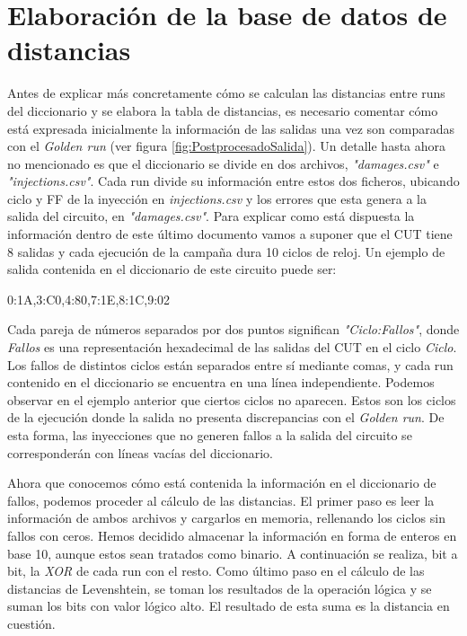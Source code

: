 \section{Elaboración de la base de datos de distancias}
\label{sec:LevenDist}
Antes de explicar más concretamente cómo se calculan las distancias entre runs del
diccionario y se elabora la tabla de distancias, es necesario comentar cómo está
expresada inicialmente la información de las salidas una vez son comparadas con el
\textit{Golden run} (ver figura \ref{fig:PostprocesadoSalida}). Un detalle hasta 
ahora no mencionado es que el diccionario se divide en dos archivos,
\textit{"damages.csv"} e \textit{"injections.csv"}. Cada run divide su información
entre estos dos ficheros, ubicando ciclo y \gls{FF} de la inyección en 
\textit{injections.csv} y los errores que esta genera a la salida del circuito, en
\textit{"damages.csv"}.
Para explicar como está dispuesta la información dentro de este último documento 
vamos a suponer que el \gls{CUT} tiene 8 salidas y cada ejecución de la campaña 
dura 10 ciclos de reloj. Un ejemplo de salida contenida en el diccionario de este
circuito puede ser:

\begin{center}
    0:1A,3:C0,4:80,7:1E,8:1C,9:02
\end{center}

Cada pareja de números separados por dos puntos significan
\textit{"Ciclo:Fallos"}, donde \textit{Fallos} es una representación hexadecimal
de las salidas del \gls{CUT} en el ciclo \textit{Ciclo}. Los fallos de distintos 
ciclos están separados entre sí mediante comas, y cada run contenido en el 
diccionario se encuentra en una línea independiente. Podemos observar en el 
ejemplo anterior que ciertos ciclos no aparecen. Estos son los ciclos de la 
ejecución donde la salida no presenta discrepancias con el \textit{Golden run}. 
De esta forma, las inyecciones que no generen fallos a la salida del circuito se 
corresponderán con líneas vacías del diccionario.

Ahora que conocemos cómo está contenida la información en el diccionario de
fallos, podemos proceder al cálculo de las distancias. El primer paso es leer la
información de ambos archivos y cargarlos en memoria, rellenando los ciclos sin
fallos con ceros. Hemos decidido almacenar la información en forma de enteros 
en base 10, aunque estos sean tratados como binario. A continuación se realiza, bit
a bit, la \textit{XOR} de cada run con el resto. Como último paso en el cálculo de
las distancias de Levenshtein, se toman los resultados de la operación lógica y se
suman los bits con valor lógico alto. El resultado de esta suma es la distancia
en cuestión.

